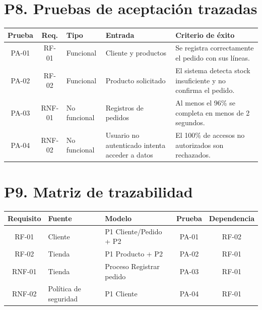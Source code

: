 \documentclass[12pt]{article}
\begin{document}
\section*{P8. Pruebas de aceptación trazadas}

\begin{center}
\small
\renewcommand{\arraystretch}{1.3}

\begin{tabular}{|c|c|p{2.2cm}|p{4cm}|p{5cm}|}
\hline
\textbf{Prueba} &
\textbf{Req.} &
\textbf{Tipo} &
\textbf{Entrada} &
\textbf{Criterio de éxito} \\ \hline

PA-01 &
RF-01 &
Funcional &
Cliente y productos &
Se registra correctamente el pedido con sus líneas. \\ \hline

PA-02 &
RF-02 &
Funcional &
Producto solicitado &
El sistema detecta stock insuficiente y no confirma el pedido. \\ \hline

PA-03 &
RNF-01 &
No funcional &
Registros de pedidos &
Al menos el 96\% se completa en menos de 2 segundos. \\ \hline

PA-04 &
RNF-02 &
No funcional &
Usuario no autenticado intenta acceder a datos &
El 100\% de accesos no autorizados son rechazados. \\ \hline

\end{tabular}
\end{center}


\section*{P9. Matriz de trazabilidad}

\begin{center}
\small
\renewcommand{\arraystretch}{1.3}

\begin{tabular}{|c|p{3cm}|p{4.5cm}|c|c|}
\hline
\textbf{Requisito} &
\textbf{Fuente} &
\textbf{Modelo} &
\textbf{Prueba} &
\textbf{Dependencia} \\ \hline

RF-01 &
Cliente &
P1 Cliente/Pedido + P2 &
PA-01 &
RF-02 \\ \hline

RF-02 &
Tienda &
P1 Producto + P2 &
PA-02 &
RF-01 \\ \hline

RNF-01 &
Tienda &
Proceso Registrar pedido &
PA-03 &
RF-01 \\ \hline

RNF-02 &
Política de seguridad &
P1 Cliente &
PA-04 &
RF-01 \\ \hline

\end{tabular}
\end{center}
\end{document}
